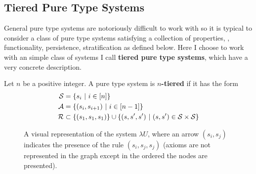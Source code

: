 \documentclass{article}
\begin{document}
\subsection{Tiered Pure Type Systems}

General pure type systems are notoriously difficult to work with so it is typical to consider a class of pure type systems satisfying a collection of properties, \eg, functionality, persistence, stratification as defined below.
Here I choose to work with an simple class of systems I call \textbf{tiered pure type systems}, which have a very concrete description.

\begin{definition}
Let $n$ be a positive integer.
A pure type system is \textbf{$n$-tiered} if it has the form
\begin{align*}
    \mathcal S &= \{s_i \ | \ i \in [n]\} \\
    \mathcal A &= \{(s_i, s_{i + 1}) \ | \ i \in [n - 1]\} \\
    \mathcal R &\subset \{(s_1, s_1, s_1)\} \cup \{(s, s', s') \ | \ (s, s') \in \mathcal S \times \mathcal S\}
\end{align*}
\end{definition}

\begin{figure}
\centering
\caption{A visual representation of the system $\lambda U$, where an arrow $(s_i, s_j)$ indicates the presence of the rule $(s_i, s_j, s_j)$ (axioms are not represented in the graph except in the ordered the nodes are presented).}
\label{fig:tiered}
\end{figure}
\end{document}
